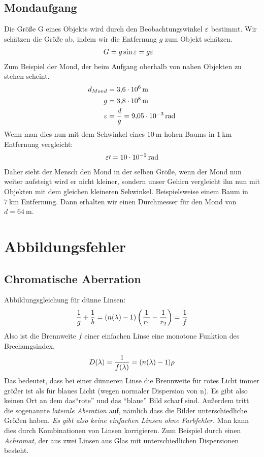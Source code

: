 \subsection{Mondaufgang}
Die Größe G eines Objekts wird durch den Beobachtungswinkel $\varepsilon$ bestimmt.
Wir schätzen die Größe ab, indem wir die Entfernung $g$ zum Objekt schätzen.
\begin{align*}
	G&=g\sin\varepsilon=g\varepsilon
\end{align*}
Zum Beispiel der Mond, der beim Aufgang oberhalb von nahen Objekten zu stehen scheint.
\begin{align*}
	d_{Mond}&=\SI{3,6e6}{\meter}\\
	g&=\SI{3,8e8}{\meter}\\
	\varepsilon&=\frac{d}{g}=\SI{9,05e-3}{\radian}
\end{align*}
Wenn man dies nun mit dem Sehwinkel eines $\SI{10}{\meter}$ hohen Baums in $\SI{1}{\kilo\meter}$ Entfernung vergleicht:
\begin{align*}
	\varepsilon\prime=\SI{10e-2}{\radian}
\end{align*}
Daher sieht der Mensch den Mond in der selben Größe, wenn der Mond nun weiter aufsteigt wird er nicht kleiner, sondern unser Gehirn vergleicht ihn nun mit Objekten mit dem gleichen kleineren Sehwinkel. Beispielsweise einem Baum in $\SI{7}{\kilo\meter}$ Entfernung. Dann erhalten wir einen Durchmesser für den Mond von $d=\SI{64}{\meter}$.

\section{Abbildungsfehler}
\subsection{Chromatische Aberration}
Abbildungsgleichung für dünne Linsen:
\begin{align*}
	\frac{1}{g}+\frac{1}{b}=(n(\lambda)-1)\left(\frac{1}{r_1}-\frac{1}{r_2}\right)=\frac{1}{f}
\end{align*}
Also ist die Brennweite $f$ einer einfachen Linse eine monotone Funktion des Brechungsindex.
\begin{align*}
	D(\lambda)=\frac{1}{f(\lambda)}=(n(\lambda)-1)\rho
\end{align*}
Das bedeutet, dass bei einer dünneren Linse die Brennweite für rotes Licht immer größer ist als für blaues Licht (wegen normaler Dispersion von n).
Es gibt also keinen Ort an dem das\enquote{rote} und das \enquote{blaue} Bild scharf sind. Außerdem tritt die sogenannte \emph{laterale Aberation} auf, nämlich dass die Bilder unterschiedliche Größen haben.
\emph{Es gibt also keine einfachen Linsen ohne Farbfehler.}
Man kann dies durch Kombinationen von Linsen korrigieren. Zum Beispiel durch einen \emph{Achromat}, der aus zwei Linsen aus Glas mit unterschiedlichen Dispersionen besteht.


